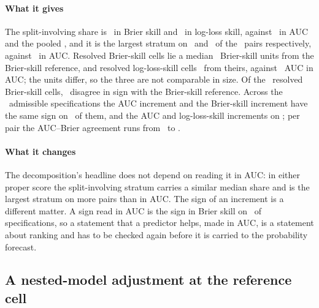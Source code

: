 

\paragraph{What it gives}
The split-involving share is \splitShareBrierPct\ in Brier skill and
\splitShareLoglossPct\ in log-loss skill, against \splitShareAucPct\ in AUC
and the pooled \shareResamplingStratumPct, and it is the largest stratum on
\nSplitLargestBrier\ and \nSplitLargestLogloss\ of the \nPairs\ pairs
respectively, against \nSplitLargestAuc\ in AUC. Resolved Brier-skill cells lie
a median \madResolvedBrierMedian\ Brier-skill units from the Brier-skill
reference, and resolved log-loss-skill cells \madResolvedLoglossMedian\ from
theirs, against \madResolvedMedian\ AUC in AUC; the units differ, so the
three are not comparable in size. Of the \nResolvedBrier\ resolved Brier-skill
cells, \nDisagreeOwnBrier\ disagree in sign with the Brier-skill reference.
Across the \nSpecsSignAgree\ admissible specifications the AUC increment and
the Brier-skill increment have the same sign on \signAgreeAucBrierPct\ of
them, and the AUC and log-loss-skill increments on \signAgreeAucLoglossPct;
per pair the AUC--Brier agreement runs from \signAgreeAucBrierPairMinPct\ to
\signAgreeAucBrierPairMaxPct.

\paragraph{What it changes}
The decomposition's headline does not depend on reading it in AUC: in either
proper score the split-involving stratum carries a similar median share and is
the largest stratum on more pairs than in AUC. The sign of an increment is a
different matter. A sign read in AUC is the sign in Brier skill on
\signAgreeAucBrierPct\ of specifications, so a statement that a predictor
helps, made in AUC, is a statement about ranking and has to be checked again
before it is carried to the probability forecast.

\subsection{A nested-model adjustment at the reference cell}
\label{app:ijf-cw}

